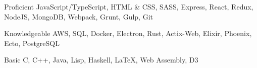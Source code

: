 

\begin{cvskills}

  \cvskill
    {Proficient} %
    {JavaScript/TypeScript, HTML \& CSS, SASS, Express, React, Redux, NodeJS, MongoDB, Webpack, Grunt, Gulp, Git} %

  \cvskill
    {Knowledgeable} %
    {AWS, SQL, Docker, Electron, Rust, Actix-Web, Elixir, Phoenix, Ecto, PostgreSQL} %

  \cvskill
    {Basic} %
    {C, C++, Java, Lisp, Haskell, \LaTeX, Web Assembly, D3} %

\end{cvskills}
